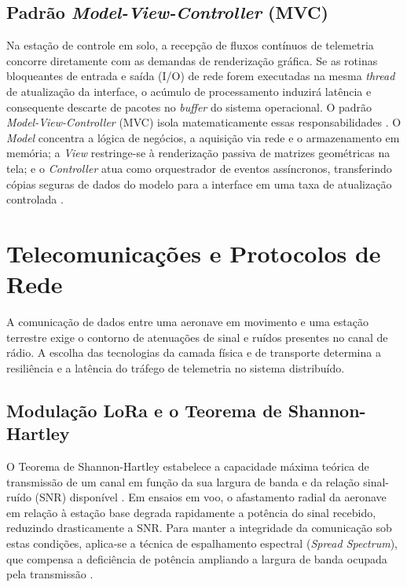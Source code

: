 \subsection{Padrão \textit{Model-View-Controller} (MVC)}

Na estação de controle em solo, a recepção de fluxos contínuos de telemetria concorre diretamente com as demandas de renderização gráfica. Se as rotinas bloqueantes de entrada e saída (I/O) de rede forem executadas na mesma \textit{thread} de atualização da interface, o acúmulo de processamento induzirá latência e consequente descarte de pacotes no \textit{buffer} do sistema operacional. O padrão \textit{Model-View-Controller} (MVC) isola matematicamente essas responsabilidades \cite{fowler_eaa}. O \textit{Model} concentra a lógica de negócios, a aquisição via rede e o armazenamento em memória; a \textit{View} restringe-se à renderização passiva de matrizes geométricas na tela; e o \textit{Controller} atua como orquestrador de eventos assíncronos, transferindo cópias seguras de dados do modelo para a interface em uma taxa de atualização controlada \cite{fowler_eaa}.

\section{Telecomunicações e Protocolos de Rede}

A comunicação de dados entre uma aeronave em movimento e uma estação terrestre exige o contorno de atenuações de sinal e ruídos presentes no canal de rádio. A escolha das tecnologias da camada física e de transporte determina a resiliência e a latência do tráfego de telemetria no sistema distribuído.

\subsection{Modulação LoRa e o Teorema de Shannon-Hartley}

O Teorema de Shannon-Hartley estabelece a capacidade máxima teórica de transmissão de um canal em função da sua largura de banda e da relação sinal-ruído (SNR) disponível \cite{haykin_communication}. Em ensaios em voo, o afastamento radial da aeronave em relação à estação base degrada rapidamente a potência do sinal recebido, reduzindo drasticamente a SNR. Para manter a integridade da comunicação sob estas condições, aplica-se a técnica de espalhamento espectral (\textit{Spread Spectrum}), que compensa a deficiência de potência ampliando a largura de banda ocupada pela transmissão \cite{haykin_communication}.

